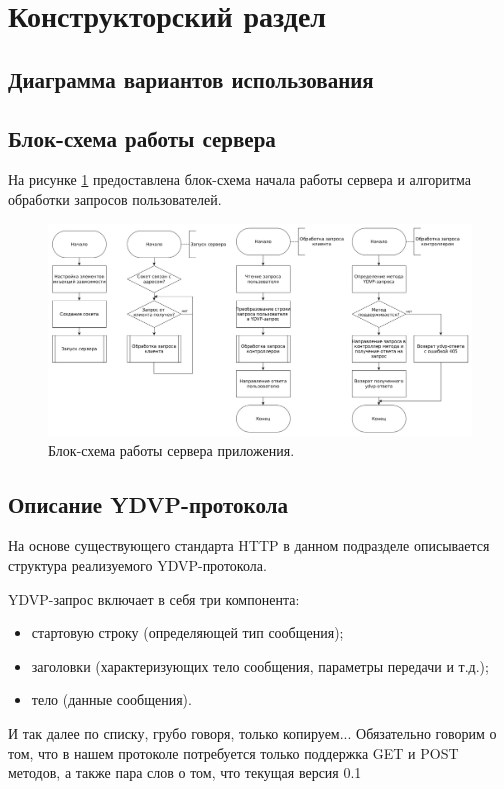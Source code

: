 \section{Конструкторский раздел}

\subsection{Диаграмма вариантов использования}

\subsection{Блок-схема работы сервера}
На рисунке \ref{fig:serverScheme} предоставлена блок-схема начала работы сервера и алгоритма обработки запросов пользователей.

\begin{figure}[hbtp]
	\centering
	\includegraphics[width=\textwidth]{img/serverScheme.png}
	\caption{Блок-схема работы сервера приложения. }
	\label{fig:serverScheme}
\end{figure}

\subsection{Описание YDVP-протокола}
На основе существующего стандарта HTTP в данном подразделе описывается структура реализуемого YDVP-протокола.

YDVP-запрос включает в себя три компонента:
\begin{itemize}[leftmargin=1.6\parindent]
\item стартовую строку (определяющей тип сообщения);
\item заголовки (характеризующих тело сообщения, параметры передачи и т.д.);
\item тело (данные сообщения).
\end{itemize}

И так далее по списку, грубо говоря, только копируем...
Обязательно говорим о том, что в нашем протоколе потребуется только поддержка GET и POST методов, а также пара слов о том, что текущая версия 0.1

\pagebreak